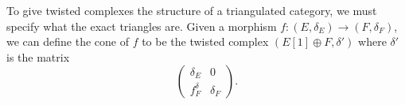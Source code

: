 
 
 To give twisted complexes the structure of a triangulated category, we must specify what the exact triangles are. Given a morphism $f: (E, \delta_E)\to (F, \delta_F)$, we can define the cone of $f$ to be the twisted complex $(E[1]\oplus F, \delta')$ where $\delta'$ is the matrix
 \[
    \left(\begin{array}{c|c} \delta_E &0 \\ \hline f^\delta_F  & \delta_F\end{array}\right).
\]

 